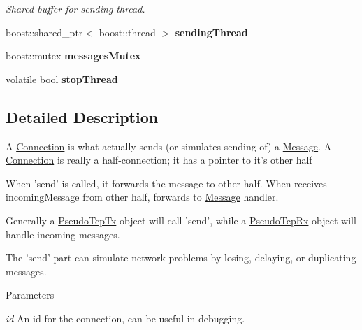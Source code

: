 \begin{DoxyCompactItemize}
\begin{DoxyCompactList}\small\item\em Shared buffer for sending thread. \item\end{DoxyCompactList}\item 
\hypertarget{classPseudoTcp_1_1Connection_aeb4d5aa737c4e972355aaa23870289e6}{
boost::shared\_\-ptr$<$ boost::thread $>$ {\bfseries sendingThread}}
\label{classPseudoTcp_1_1Connection_aeb4d5aa737c4e972355aaa23870289e6}

\item 
\hypertarget{classPseudoTcp_1_1Connection_ae4a518d298dab48493c1a37895c01342}{
boost::mutex {\bfseries messagesMutex}}
\label{classPseudoTcp_1_1Connection_ae4a518d298dab48493c1a37895c01342}

\item 
\hypertarget{classPseudoTcp_1_1Connection_aa1720cbec441514dbfe72699975d3f4b}{
volatile bool {\bfseries stopThread}}
\label{classPseudoTcp_1_1Connection_aa1720cbec441514dbfe72699975d3f4b}

\end{DoxyCompactItemize}


\subsection{Detailed Description}
A \hyperlink{classPseudoTcp_1_1Connection}{Connection} is what actually sends (or simulates sending of) a \hyperlink{classPseudoTcp_1_1Message}{Message}. A \hyperlink{classPseudoTcp_1_1Connection}{Connection} is really a half-\/connection; it has a pointer to it's other half

When 'send' is called, it forwards the message to other half. When receives incomingMessage from other half, forwards to \hyperlink{classPseudoTcp_1_1Message}{Message} handler.

Generally a \hyperlink{classPseudoTcp_1_1PseudoTcpTx}{PseudoTcpTx} object will call 'send', while a \hyperlink{classPseudoTcp_1_1PseudoTcpRx}{PseudoTcpRx} object will handle incoming messages.

The 'send' part can simulate network problems by losing, delaying, or duplicating messages.


\begin{DoxyParams}{Parameters}
\item[{\em id}]An id for the connection, can be useful in debugging. \end{DoxyParams}


